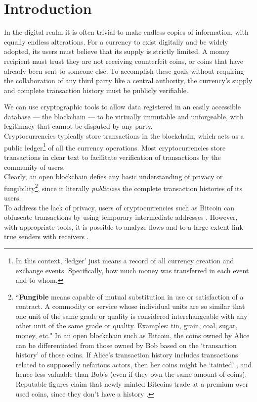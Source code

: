 \chapter{Introduction}%
\label{chapter:introduction}

In the digital realm it is often trivial to make endless copies of information, with equally endless alterations. For a currency to exist digitally and be widely adopted, its users must believe that its supply is strictly limited. A money recipient must trust they are not receiving counterfeit coins, or coins that have already been sent to someone else. To accomplish these goals without requiring the collaboration of any third party like a central authority, the currency's supply and complete transaction history must be publicly verifiable.

We can use cryptographic tools to allow data registered in an easily accessible database --- the blockchain --- to be virtually immutable and unforgeable, with legitimacy that cannot be disputed by any party.
\\ \newline
Cryptocurrencies typically store transactions in the blockchain, which acts as a public ledger\footnote{In this context, `ledger' just means a record of all currency creation and exchange events. Specifically, how much money was transferred in each event and to whom.} of all the currency operations. Most cryptocurrencies store transactions in clear text to facilitate verification of transactions by the community of users.
\\ \newline
Clearly, an open blockchain defies any basic understanding of privacy or fungibility\footnote{``\textbf{Fungible} means capable of mutual substitution in use or satisfaction of a contract. A commodity or service whose individual units are so similar that one unit of the same grade or quality is considered interchangeable with any other unit of the same grade or quality. Examples: tin, grain, coal, sugar, money, etc." \cite{mises-org-fungible} In an open blockchain such as Bitcoin, the coins owned by Alice can be differentiated from those owned by Bob based on the `transaction history' of those coins. If Alice's transaction history includes transactions related to supposedly nefarious actors, then her coins might be `tainted' \cite{bitcoin-big-bang-taint}, and hence less valuable than Bob's (even if they own the same amount of coins). Reputable figures claim that newly minted Bitcoins trade at a premium over used coins, since they don't have a history \cite{new-bitcoin-premium}.}, since it literally {\em publicizes} the complete transaction histories of its users.
\\ \newline
To address the lack of privacy, users of cryptocurrencies such as Bitcoin can obfuscate transactions by using temporary intermediate addresses \cite{DBLP:journals/corr/NarayananM17}. However, with appropriate tools, it is possible to analyze flows and to a large extent link true senders with receivers \cite{DBLP:journals/corr/ShenTuY15b, DK-police-tracing-btc, Andrew-Cox-Sandia, chainalysis-2020-report}.

